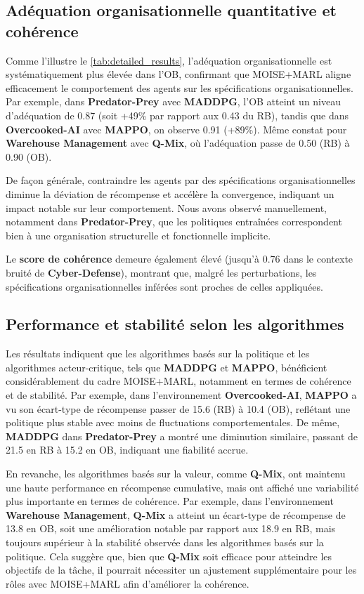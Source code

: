 \documentclass[final]{jfsma}
\begin{document}
\subsection{Adéquation organisationnelle quantitative et cohérence}

\noindent
Comme l'illustre le \autoref{tab:detailed_results}, l'adéquation organisationnelle est systématiquement plus élevée dans l'OB, confirmant que MOISE+MARL aligne efficacement le comportement des agents sur les spécifications organisationnelles.
Par exemple, dans \textbf{Predator-Prey} avec \textbf{MADDPG}, l'OB atteint un niveau d'adéquation de 0.87 (soit +49\% par rapport aux 0.43 du RB), tandis que dans \textbf{Overcooked-AI} avec \textbf{MAPPO}, on observe 0.91 (+89\%). Même constat pour \textbf{Warehouse Management} avec \textbf{Q-Mix}, où l'adéquation passe de 0.50 (RB) à 0.90 (OB).

\medskip
\noindent
De façon générale, contraindre les agents par des spécifications organisationnelles diminue la déviation de récompense et accélère la convergence, indiquant un impact notable sur leur comportement. Nous avons observé manuellement, notamment dans \textbf{Predator-Prey}, que les politiques entraînées correspondent bien à une organisation structurelle et fonctionnelle implicite.

\medskip
\noindent
Le \textbf{score de cohérence} demeure également élevé (jusqu’à 0.76 dans le contexte bruité de \textbf{Cyber-Defense}), montrant que, malgré les perturbations, les spécifications organisationnelles inférées sont proches de celles appliquées.

\subsection{Performance et stabilité selon les algorithmes}

Les résultats indiquent que les algorithmes basés sur la politique et les algorithmes acteur-critique, tels que \textbf{MADDPG} et \textbf{MAPPO}, bénéficient considérablement du cadre MOISE+MARL, notamment en termes de cohérence et de stabilité. Par exemple, dans l'environnement \textbf{Overcooked-AI}, \textbf{MAPPO} a vu son écart-type de récompense passer de 15.6 (RB) à 10.4 (OB), reflétant une politique plus stable avec moins de fluctuations comportementales. De même, \textbf{MADDPG} dans \textbf{Predator-Prey} a montré une diminution similaire, passant de 21.5 en RB à 15.2 en OB, indiquant une fiabilité accrue.

En revanche, les algorithmes basés sur la valeur, comme \textbf{Q-Mix}, ont maintenu une haute performance en récompense cumulative, mais ont affiché une variabilité plus importante en termes de cohérence. Par exemple, dans l'environnement \textbf{Warehouse Management}, \textbf{Q-Mix} a atteint un écart-type de récompense de 13.8 en OB, soit une amélioration notable par rapport aux 18.9 en RB, mais toujours supérieur à la stabilité observée dans les algorithmes basés sur la politique. Cela suggère que, bien que \textbf{Q-Mix} soit efficace pour atteindre les objectifs de la tâche, il pourrait nécessiter un ajustement supplémentaire pour les rôles avec MOISE+MARL afin d'améliorer la cohérence.
\end{document}
